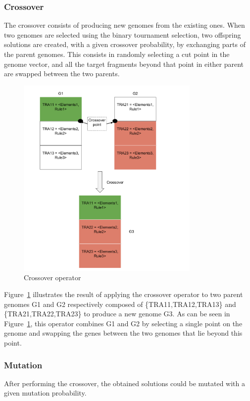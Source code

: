 \documentclass[conference]{IEEEtran}
\begin{document}
\subsubsection{\textbf{Crossover}}
The crossover consists of producing new genomes from the existing ones. When two genomes are selected using the binary tournament selection, two offspring solutions are created, with a given crossover probability, by exchanging parts of the parent genomes. This consists in randomly selecting a cut point in the genome vector, and all the target fragments beyond that point in either parent are swapped between the two parents.

\begin{figure}[!ht]
\centering
\includegraphics[width=3.49in]{crossover.pdf}
\caption{Crossover operator}
\label{crossover}
\end{figure}

Figure~\ref{crossover} illustrates the result of applying the crossover operator to two parent genomes G1 and G2 respectively composed of \{TRA11,TRA12,TRA13\} and \{TRA21,TRA22,TRA23\} to produce a new genome G3. As can be seen in Figure~\ref{crossover}, this operator combines G1 and G2 by selecting a single point on the genome and swapping the genes between the two genomes that lie beyond this point. 

\subsubsection{\textbf{Mutation}}
After performing the crossover, the obtained solutions could be mutated with a given mutation probability.
\end{document}
